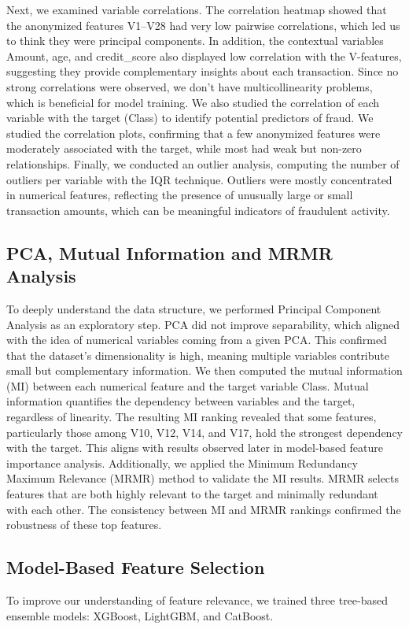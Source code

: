 \documentclass[12pt]{report} %
\begin{document}
Next, we examined variable correlations. The correlation heatmap showed that the anonymized features V1–V28 had very low pairwise correlations, which led us to think they were principal components. In addition, the contextual variables Amount, age, and credit\_score also displayed low correlation with the V-features, suggesting they provide complementary insights about each transaction.
Since no strong correlations were observed, we don’t have multicollinearity problems, which is beneficial for model training.
We also studied the correlation of each variable with the target (Class) to identify potential predictors of fraud. We studied the correlation plots, confirming that a few anonymized features were moderately associated with the target, while most had weak but non-zero relationships.
Finally, we conducted an outlier analysis, computing the number of outliers per variable with the IQR technique. Outliers were mostly concentrated in numerical features, reflecting the presence of unusually large or small transaction amounts, which can be meaningful indicators of fraudulent activity.

\subsection{PCA, Mutual Information and MRMR Analysis}
To deeply understand the data structure, we performed Principal Component Analysis as an exploratory step. PCA did not improve separability, which aligned with the idea of numerical variables coming from a given PCA. This confirmed that the dataset’s dimensionality is high, meaning multiple variables contribute small but complementary information.
We then computed the mutual information (MI) between each numerical feature and the target variable Class. Mutual information quantifies the dependency between variables and the target, regardless of linearity. The resulting MI ranking revealed that some features, particularly those among V10, V12, V14, and V17, hold the strongest dependency with the target. This aligns with results observed later in model-based feature importance analysis.
Additionally, we applied the Minimum Redundancy Maximum Relevance (MRMR) method to validate the MI results. MRMR selects features that are both highly relevant to the target and minimally redundant with each other. The consistency between MI and MRMR rankings confirmed the robustness of these top features.

\subsection{Model-Based Feature Selection}
To improve our understanding of feature relevance, we trained three tree-based ensemble models: XGBoost, LightGBM, and CatBoost.
\end{document}
